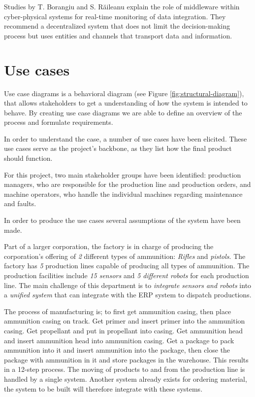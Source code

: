 Studies by T. Borangiu and S. Răileanu \cite{Borangiu2020} explain the role of middleware within cyber-physical systems for real-time monitoring of data integration. They recommend a decentralized system that does not limit the decision-making process but uses entities and channels that transport data and information.

\section{Use cases}
\label{sec:use-case}


Use case diagrams is a behavioral diagram (see Figure \ref{fig:structural-diagram}), that allows stakeholders to get a understanding of how the system is intended to behave. By creating use case diagrams we are able to define an overview of the process and formulate requirements. 

In order to understand the case, a number of use cases have been elicited. These use cases serve as the project's backbone, as they list how the final product should function.

For this project, two main stakeholder groups have been identified: production managers, who are responsible for the production line and production orders, and machine operators, who handle the individual machines regarding maintenance and faults.


In order to produce the use cases several assumptions of the system have been made.

Part of a larger corporation, the factory is in charge of producing the corporation's offering of \textit{2} different types of ammunition: \textit{Rifles} and \textit{pistols}. 
The factory has \textit{5} production lines capable of producing all types of ammunition.
The production facilities include \textit{15 sensors} and \textit{5 different robots} for each production line.
The main challenge of this department is to \textit{integrate sensors and robots} into a \textit{unified system} that can integrate with the ERP system to dispatch productions.

The process of manufacturing is; to first get ammunition casing, then place ammunition casing on track. Get primer
and insert primer into the ammunition casing. Get propellant and put in propellant into casing. Get ammunition head and insert ammunition head into ammunition casing. Get a package to pack ammunition into it and insert ammunition into the package, then close the package with ammunition in it and store packages in the warehouse. This results in a 12-step process.
The moving of products to and from the production line is handled by a single system. Another system already exists for ordering material, the system to be built will therefore integrate with these systems.

